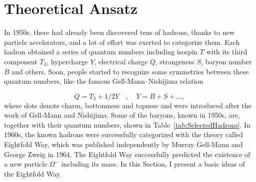 \section{Theoretical Ansatz}
\label{Sec:TheoreticalAnsatz}

In 1950s, there had already been discovered tens of hadrons, thanks to new
particle accelerators, and a lot of effort was exerted to categorize them. 
Each hadron obtained a series of quantum numbers including isospin $T$ with
its third component $T_3$, hypercharge $Y$, electrical charge $Q$, strangeness
$S$, baryon number $B$ and others. 
Soon, people started to recognize some symmetries between these quantum numbers,
like the famous Gell-Mann--Nishijima relation
\cite{GellMannNishijima1,GellMannNishijima2}

\begin{equation}
  Q = T_3 + 1/2 Y \quad , \quad Y = B + S + \dots,
  \label{ex:GellMannNishijima}
\end{equation}
where dots denote charm, bottomness and topness and were introduced after the
work of Gell-Mann and Nishijima. 
Some of the baryons, known in 1950s, are, together with their quantum numbers,
shown in Table~\ref{tab:SelectedHadrons}. 
In 1960s, the known hadrons were successfully categorized with the theory called
Eightfold Way, which was published independently by Murray Gell-Mann
\cite{Gell-Mann:101798} and George Zweig \cite{Zweig:570209} in 1964. 
The Eightfold Way successfully predicted the existence of a new particle
$\Omega^{-}$ including its mass. 
In this Section, I present a basic ideas of the Eightfold Way.

